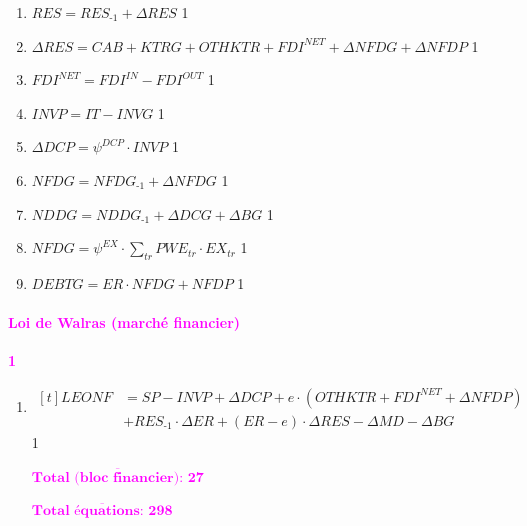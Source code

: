 \documentclass[11pt,a4paper]{article}
\newcommand{\NDDG}{\mathit{NDDG}}
\newcommand{\CAB}{\mathit{CAB}}
\newcommand{\EX}{\mathit{EX}}
\newcommand{\IT}{\mathit{IT}}
\newcommand{\LEONF}{\mathit{LEONF}}
\newcommand{\PWE}{\mathit{PWE}}
\newcommand{\tr}{\mathit{tr}}
\newcommand{\redparagraph}[1]{\paragraph*{\large\textcolor{Fuchsia}{#1}}}
\newcommand{\INVG}{\mathit{INVG}}
\newcommand{\KTRG}{\mathit{KTRG}}
\newcommand{\NFDG}{\mathit{NFDG}}
\newcommand{\DCG}{\mathit{DCG}}
\newcommand{\BG}{\mathit{BG}}
\newcommand{\SP}{\mathit{SP}}
\newcommand{\RES}{\mathit{RES}}
\newcommand{\OTHKTR}{\mathit{OTHKTR}}
\newcommand{\FDI}{\mathit{FDI}}
\newcommand{\NFDP}{\mathit{NFDP}}
\newcommand{\MD}{\mathit{MD}}
\newcommand{\DCP}{\mathit{DCP}}
\newcommand{\INVP}{\mathit{INVP}}
\newcommand{\ER}{\mathit{ER}}
\newcommand{\DEBTG}{\mathit{DEBTG}}
\begin{document}
\begin{enumerate}[itemsep=2pt,label=\textbf{eqfin\arabic*}.,  ref=\textbf{eqfin\arabic*}]
		\item 	$\RES  = \RES_{\textit{-1}} + \Delta \RES$ \hfill 1	
		
		\item 	$\Delta \RES = \CAB + \KTRG + \OTHKTR + \FDI^{\textit{NET}} + \Delta \NFDG + \Delta \NFDP $ \hfill 1	
		
		\item 	$\FDI^{\textit{NET}} = \FDI^{\textit{IN}} - \FDI^{\textit{OUT}} $ \hfill 1							
		
		\item 	$\INVP  = \IT - \INVG$ \hfill 1		
		
		\item 	$\Delta\DCP = \psi^{\DCP} \cdot \INVP$ \hfill 1	
		
		\item 	$\NFDG  = \NFDG_{\textit{-1}} + \Delta \NFDG$ \hfill 1		
		
		\item 	$\NDDG  = \NDDG_{\textit{-1}} + \Delta \DCG+ \Delta \BG$ \hfill 1							
		
		\item 	$\NFDG  = \psi^{\EX} \cdot \sum_{\tr}\PWE_{\tr}\cdot\EX_{\tr}$ \hfill 1		
		
		\item 	$\DEBTG = \ER\cdot\NFDG + \NFDP$ \hfill 1			
	\end{enumerate}
	
	\redparagraph{Loi de Walras (marché financier)}\hfill \textcolor{Fuchsia}{\textbf{1}} 
	\begin{enumerate}[itemsep=2pt,label=\textbf{eqfin\arabic*}.,resume,  ref=\textbf{eqfin\arabic*}]
		\item 	$ \begin{aligned}[t]
			\LEONF & = \SP - \INVP + \Delta\DCP + e \cdot \left(\OTHKTR + \FDI^{\textit{NET}} + \Delta\NFDP\right)\\
			& + \RES_{\textit{-1}} \cdot \Delta \ER + (\ER - e) \cdot \Delta\RES - \Delta\MD - \Delta\BG
		\end{aligned}$   \hfill 1
		
		\hfill \textcolor{Fuchsia}{$\overline{\textbf{Total (bloc financier): 27}}$}
		
		\hfill \textcolor{Fuchsia}{$\overline{\textbf{Total équations: 298}}$}
	\end{enumerate}
	
\end{document}
